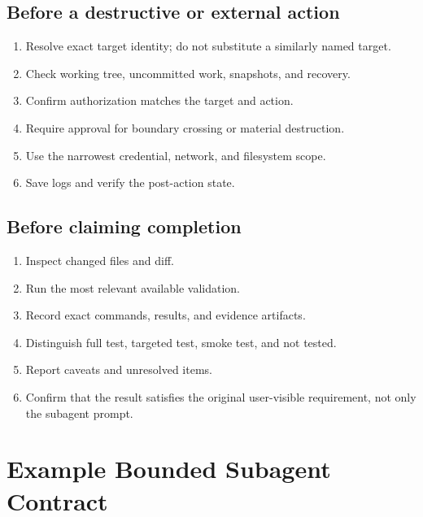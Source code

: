 \documentclass[11pt,a4paper]{article}
\begin{document}
\subsection{Before a destructive or external action}
\begin{enumerate}
  \item Resolve exact target identity; do not substitute a similarly named target.
  \item Check working tree, uncommitted work, snapshots, and recovery.
  \item Confirm authorization matches the target and action.
  \item Require approval for boundary crossing or material destruction.
  \item Use the narrowest credential, network, and filesystem scope.
  \item Save logs and verify the post-action state.
\end{enumerate}

\subsection{Before claiming completion}
\begin{enumerate}
  \item Inspect changed files and diff.
  \item Run the most relevant available validation.
  \item Record exact commands, results, and evidence artifacts.
  \item Distinguish full test, targeted test, smoke test, and not tested.
  \item Report caveats and unresolved items.
  \item Confirm that the result satisfies the original user-visible requirement, not only the subagent prompt.
\end{enumerate}

\section{Example Bounded Subagent Contract}\label{sec:subagent-contract}
\end{document}
